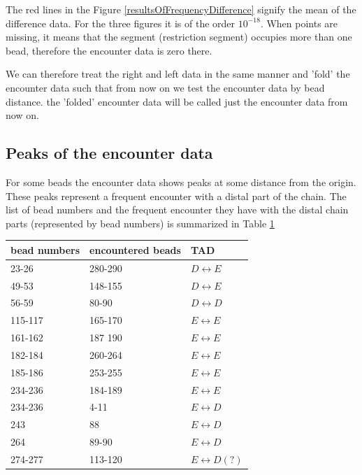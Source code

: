 \documentclass[12pt]{book}
\begin{document}
The red lines in the Figure \ref{resultsOfFrequencyDifference} signify the mean of the difference data. For the three figures it is of the order $10^{-18}$. When points are missing, it means that the segment (restriction segment) occupies more than one bead, therefore the encounter data is zero there. 

We can therefore treat the right and left data in the same manner and 'fold' the encounter data such that from now on we test the encounter data by bead distance. the 'folded' encounter data will be called just the encounter data from now on. 

\subsection{Peaks of the encounter data}
For some beads the encounter data shows peaks at some distance from the origin. 
These peaks represent a frequent encounter with a distal part of the chain. The list of bead numbers and the frequent encounter they have with the distal chain parts (represented by bead numbers) is summarized in Table \ref{nonNeighborBeadEncounterTable}
\begin{table}[H]\label{nonNeighborBeadEncounterTable}
\begin{tabular}{l l l}
bead numbers & encountered beads & TAD\\
\hline
23-26   & 280-290 & $D\leftrightarrow E$\\
49-53   & 148-155 & $D\leftrightarrow E$\\
56-59   & 80-90   & $D\leftrightarrow D$\\
115-117 & 165-170 & $E\leftrightarrow E$\\
161-162 & 187 190 & $E\leftrightarrow E$\\
182-184 & 260-264 & $E\leftrightarrow E$\\
185-186 & 253-255 & $E\leftrightarrow E$\\
234-236 & 184-189 & $E\leftrightarrow E$\\
234-236 & 4-11    & $E\leftrightarrow D$\\
243     & 88      & $E\leftrightarrow D$\\
264     & 89-90   & $E\leftrightarrow D$\\
274-277 & 113-120 & $E\leftrightarrow D(?)$
\end{tabular}
\end{table}
\end{document}
